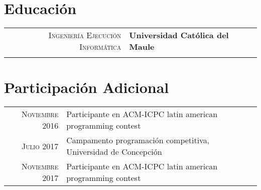 \documentclass[a4paper,10pt]{article} %
\begin{document}

\section{Educaci\'on}
\begin{tabular}{rl}	


\textsc{Ingenier\'ia Ejecuci\'on Inform\'atica} & \textbf{Universidad Cat\'olica del Maule}\\
&\\


\end{tabular}


\section{Participaci\'on Adicional}

\begin{tabular}{rl}
\textsc{Noviembre} 2016 & Participante en ACM-ICPC latin american programming contest\\

\textsc{Julio} 2017 & Campamento programaci\'on competitiva, Universidad de Concepci\'on\\

\textsc{Noviembre} 2017 & Participante en ACM-ICPC latin american programming contest\\

\end{tabular}

\end{document}
